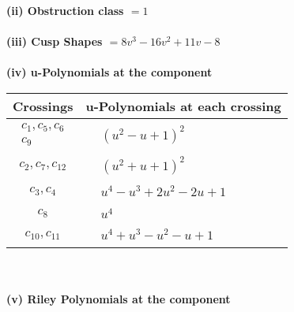 \documentclass[1p]{elsarticle_modified}
\theoremstyle{definition}
\begin{document}
\flushleft \textbf{(ii) Obstruction class $= 1$}\\~\\
\flushleft \textbf{(iii) Cusp Shapes $= 8 v^3-16 v^2+11 v-8$}\\~\\
\newpage\renewcommand{\arraystretch}{1}
\flushleft \textbf{(iv) u-Polynomials at the component}\newline \\
\begin{tabular}{m{50pt}|m{274pt}}
Crossings & \hspace{64pt}u-Polynomials at each crossing \\
\hline $$\begin{aligned}c_{1},c_{5},c_{6}\\c_{9}\end{aligned}$$&$\begin{aligned}
&(u^2- u+1)^2
\end{aligned}$\\
\hline $$\begin{aligned}c_{2},c_{7},c_{12}\end{aligned}$$&$\begin{aligned}
&(u^2+u+1)^2
\end{aligned}$\\
\hline $$\begin{aligned}c_{3},c_{4}\end{aligned}$$&$\begin{aligned}
&u^4- u^3+2 u^2-2 u+1
\end{aligned}$\\
\hline $$\begin{aligned}c_{8}\end{aligned}$$&$\begin{aligned}
&u^4
\end{aligned}$\\
\hline $$\begin{aligned}c_{10},c_{11}\end{aligned}$$&$\begin{aligned}
&u^4+u^3- u^2- u+1
\end{aligned}$\\
\hline
\end{tabular}\\~\\
\newpage\renewcommand{\arraystretch}{1}
\flushleft \textbf{(v) Riley Polynomials at the component}\newline \\
\end{document}
